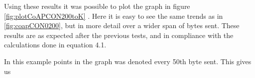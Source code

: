 Using these results it was possible to plot the graph in figure \ref{fig:plotCoAPCON200toK} . Here it is easy to see the same trends as in  \ref{fig:coapCON0200}, but in more detail over a wider span of bytes sent. These results are as expected after the previous tests, and in compliance with the calculations done in equation 4.1. 

In this example points in the graph was denoted every 50th byte sent. This gives us 



 


